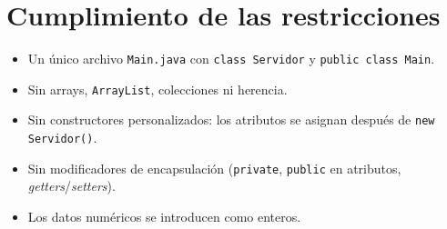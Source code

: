 \documentclass[11pt,a4paper]{article}
\begin{document}
\section{Cumplimiento de las restricciones}
\begin{itemize}[nosep]
  \item Un único archivo \texttt{Main.java} con \texttt{class Servidor} y \texttt{public class Main}.
  \item Sin arrays, \texttt{ArrayList}, colecciones ni herencia.
  \item Sin constructores personalizados: los atributos se asignan después de \texttt{new Servidor()}.
  \item Sin modificadores de encapsulación (\texttt{private}, \texttt{public} en atributos, \textit{getters}/\textit{setters}).
  \item Los datos numéricos se introducen como enteros.
\end{itemize}
\end{document}
